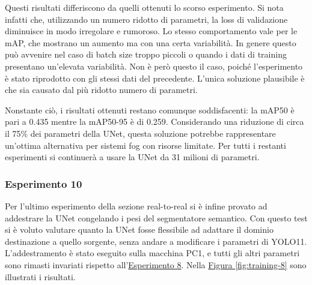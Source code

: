 \documentclass[12pt]{report}
\begin{document}
Questi risultati differiscono da quelli ottenuti lo scorso esperimento. Si nota infatti che, utilizzando un numero ridotto di parametri, la loss di validazione diminuisce in modo irregolare e rumoroso. Lo stesso comportamento vale per le mAP, che mostrano un aumento ma con una certa variabilità. In genere questo può avvenire nel caso di batch size troppo piccoli o quando i dati di training presentano un'elevata variabilità. Non è però questo il caso, poiché l'esperimento è stato riprodotto con gli stessi dati del precedente. L'unica soluzione plausibile è che sia causato dal più ridotto numero di parametri.

Nonstante ciò, i risultati ottenuti restano comunque soddisfacenti: la mAP50 è pari a 0.435 mentre la mAP50-95 è di 0.259. Considerando una riduzione di circa il 75\% dei parametri della UNet, questa soluzione potrebbe rappresentare un'ottima alternativa per sistemi fog con risorse limitate. Per tutti i restanti esperimenti si continuerà a usare la UNet da 31 milioni di parametri.

\subsubsection{Esperimento 10}
\label{sec:esperimento_10}

Per l'ultimo esperimento della sezione real-to-real si è infine provato ad addestrare la UNet congelando i pesi del segmentatore semantico. Con questo test si è voluto valutare quanto la UNet fosse flessibile ad adattare il dominio destinazione a quello sorgente, senza andare a modificare i parametri di YOLO11. L'addestramento è stato eseguito sulla macchina PC1, e tutti gli altri parametri sono rimasti invariati rispetto all'\hyperref[sec:esperimento_8]{Esperimento 8}. Nella \hyperref[fig:training-8]{Figura \ref{fig:training-8}} sono illustrati i risultati.
\end{document}
